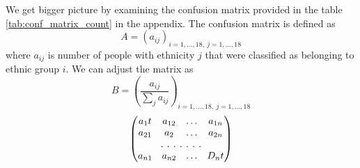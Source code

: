 We get bigger picture by examining the
confusion matrix provided in the table \ref{tab:conf_matrix_count} in the appendix. The confusion matrix is defined as 
$$A = \left(a_{ij}\right)_{i = 1, \dots, 18,\:j = 1, \dots, 18}$$
where $a_{ij}$ is number of people with ethnicity $j$ that were classified as belonging to ethnic group $i$. We can adjust the matrix as
$$B = \left(\frac{a_{ij}}{\sum_j a_{ij}} \right)_{i = 1, \dots, 18,\:j = 1, \dots, 18}$$
\begin{equation*}
\begin{pmatrix} 
a_1t& a_{12} &\dots& a_{1n}\\
a_{21}&a_2&\dots& a_{2n}\\
\hdotsfor[2]{4}\\
a_{n1}&a_{n2}&\dots&D_nt
\end{pmatrix}
\end{equation*} 
